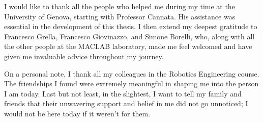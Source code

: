 

\begin{acknowledgements}


I would like to thank all the people who helped me during my time at the University of Genova, starting with Professor Cannata. His assistance was essential in the development of this thesis.
I then extend my deepest gratitude to Francesco Grella, Francesco Giovinazzo, and Simone Borelli, who, along with all the other people at the MACLAB laboratory, made me feel welcomed and have given me invaluable advice throughout my journey.

On a personal note, I thank all my colleagues in the Robotics Engineering course. The friendships I found were extremely meaningful in shaping me into the person I am today.
Last but not least, in the slightest, I want to tell my family and friends that their unwavering support and belief in me did not go unnoticed; I would not be here today if it weren't for them. 


\end{acknowledgements}
